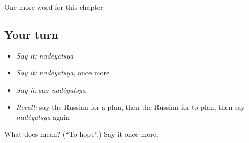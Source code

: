 \begin{grammarlens}[title={What you've built}]
One more word for this chapter.
\end{grammarlens}

\subsection*{Your turn}
\begin{itemize}
\raggedright
  \item \emph{Say it:} \emph{nadéyatsya}
  \item \emph{Say it:} \emph{nadéyatsya}, once more
  \item \emph{Say it:} say \emph{nadéyatsya}
  \item \emph{Recall:} say the Russian for a plan, then the Russian for to plan, then say \emph{nadéyatsya} again
\end{itemize}

\begin{tcolorbox}[breakable,colback=teal!4,colframe=teal!35!black,title={Before you move on}]
What does  mean? (\textquotedblleft{}To hope\textquotedblright{}.) Say it once more.
\end{tcolorbox}
